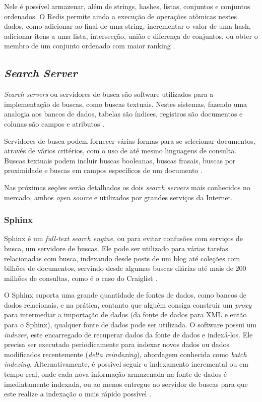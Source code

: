 \documentclass[diss]{template/setrem}
\begin{document}
Nele é possível armazenar, além de strings, hashes, listas, conjuntos e conjuntos ordenados. O Redis permite ainda a execução de operações atômicas nestes dados, como adicionar ao final de uma string, incrementar o valor de uma hash, adicionar itens a uma lista, intersecção, união e diferença de conjuntos, ou obter o membro de um conjunto ordenado com maior ranking \citep{Redis2012}.

\subsection{\emph{Search Server}}
\emph{Search servers} ou servidores de busca são software utilizados para a implementação de buscas, como buscas textuais. Nestes sistemas, fazendo uma analogia aos bancos de dados, tabelas são índices, registros são documentos e colunas são campos e atributos \citep{Aksyonoff2011}.

Servidores de busca podem fornecer várias formas para se selecionar documentos, através de vários critérios, com o uso de até mesmo linguagens de consulta. Buscas textuais podem incluir buscas booleanas, buscas frasais, buscas por proximidade e buscas em campos específicos de um documento \citep{Aksyonoff2011}.

Nas próximas seções serão detalhados os dois \emph{search servers} mais conhecidos no mercado, ambos \emph{open source} e utilizados por grandes serviços da Internet.

\subsubsection{Sphinx}
Sphinx é um \emph{full-text search engine}, ou para evitar confusões com serviços de busca, um servidore de buscas. Ele pode ser utilizado para várias tarefas relacionadas com busca, indexando desde posts de um blog até coleções com bilhões de documentos, servindo desde algumas buscas diárias até mais de 200 milhões de consultas, como é o caso do Craiglist \citep{Aksyonoff2011}.

O Sphinx suporta uma grande quantidade de fontes de dados, como bancos de dados relacionais, e na prática, contanto que alguém consiga construir um \emph{proxy} para intermediar a importação de dados (da fonte de dados para XML e então para o Sphinx), qualquer fonte de dados pode ser utilizada. O software possui um \emph{indexer}, este encarregado de recuperar dados da fonte de dados e indexá-los. Ele precisa ser executado periodicamente para indexar novos dados ou dados modificados recentemente (\emph{delta reindexing}),  abordagem conhecida como \emph{batch indexing}. Alternativamente, é possível seguir o indexamento incremental ou em tempo real, onde cada nova informação armazenada na fonte de dados é imediatamente indexada, ou ao menos entregue ao servidor de buscas para que este realize a indexação o mais rápido possível \citep{Aksyonoff2011}.
\end{document}
